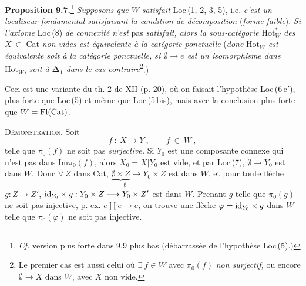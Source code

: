 \textbf{Proposition 9.7.}\footnote[50]{\textit{Cf.} version plus forte dans 9.9 plus bas (débarrassée de l'hypothèse Loc\,(5).)} \textit{Supposons que $W$ satisfait} Loc\,(1, 2, 3, 5), i.e. \textit{c'est un localiseur fondamental satisfaisant la condition de décomposition} (\textit{forme faible}). \textit{Si l'axiome} Loc\,(8) \textit{de connexité n'est} pas \textit{satisfait, alors la sous-catégorie} $\mathrm{Hot}^*_W$ \textit{des $X\ \in$} Cat \textit{non vides est équivalente à la catégorie ponctuelle} (\textit{donc} $\mathrm{Hot}_W$ \textit{est équivalente soit à la catégorie ponctuelle, si $\emptyset\longrightarrow e$ est un isomorphisme dans} $\mathrm{Hot}_W$, \textit{soit à $\boldsymbol{\Delta}_1$ dans le cas contraire}\footnote[51]{Le premier cas est aussi celui où $\exists\ f\in W$ avec $\pi_0(f)$ \textit{non surjectif,} ou encore $\emptyset\longrightarrow X$ dans $W$, avec $X$ non vide.}.)

Ceci est une variante du th. 2 de XII (p. 20), où on faisait l'hypothèse Loc\,(6\,c$'$), plus forte que Loc\,(5) et même que Loc\,(5\,bis), mais avec la conclusion plus forte que $W=\mathrm{Fl}(\mathrm{Cat})$.

\textsc{Démonstration}. Soit
\[
f\ :\ X\longrightarrow Y\ ,\qquad f\ \in\ W\ ,
\]
telle que $\pi_0(f)$ ne soit pas \textit{surjective.} Si $Y_0$ est une composante connexe qui n'est pas dans $\mathrm{Im}\pi_0(f)$, alors $X_0=X|Y_0$ est vide, et par Loc\,(7), $\emptyset\longrightarrow Y_0$ est dans $W$. Donc $\forall\ Z$ dans Cat, %
$\underbrace{\emptyset\times Z}_{=\,\emptyset}\longrightarrow Y_0\times Z$ est dans $W$, et pour toute flèche $g : Z\longrightarrow Z'$, $\mathrm{id}_{Y_0}\times g : Y_0\times Z\longrightarrow Y_0\times Z'$ est dans $W$. Prenant $g$ telle que $\pi_0(g)$ ne soit pas injective, p. ex. $e\amalg e\longrightarrow e$, on trouve une flèche $\varphi=\mathrm{id}_{Y_0}\times g$ dans $W$ telle que $\pi_0(\varphi)$ ne soit pas injective.


